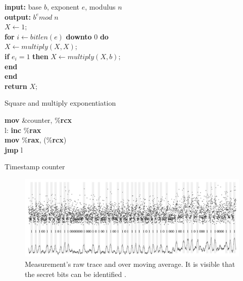 \begin{algorithm}[t]
	\textbf{input:} base $b$, exponent $e$, modulus $n$\\
	\textbf{output:} $b^e mod \; n$\\
	$X \leftarrow 1;$\\
	\textbf{for} $i \leftarrow bitlen(e)$ \textbf{downto} $0$ \textbf{do}\\
	\tab $X \leftarrow multiply(X, X);$\\
	\tab \textbf{if} $e_i=1$ \textbf{then}
	\tab \tab $X \leftarrow multiply(X, b);$\\
	\tab \textbf{end}\\
	\textbf{end}\\
	\textbf{return} $X;$

	\caption{Square and multiply exponentiation \cite{mge}}
	\label{alg:rsa1}
\end{algorithm}

\begin{algorithm}[t]
	\textbf{mov} \&counter, \%\textbf{rcx}\\
	l: \textbf{inc} \%\textbf{rax}\\
	\textbf{mov} \%\textbf{rax}, (\%\textbf{rcx})\\
	\textbf{jmp} l
	\caption{Timestamp counter \cite{mge}}
	\label{alg:timer}
\end{algorithm}

\begin{figure}
	\includegraphics[scale=0.2]{images/ppres}
	\caption{Measurement's raw trace and over moving average. It is visible that the secret bits can be identified \cite{mge}.}
	\label{fig:ppres}
\end{figure}

